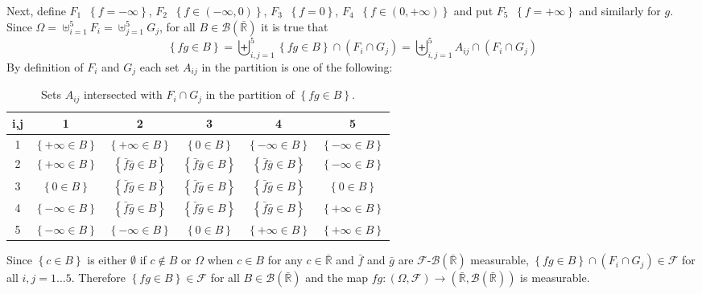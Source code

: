 \documentclass[a4paper]{article}
\newcommand{\obj}[1]{\left\{ #1 \right \}}
\newcommand{\brac}[1]{\left ( #1 \right )}
\newcommand{\Rbar}{{\bar{\mathbb{R}}}}
\newcommand{\Fcal}{\mathcal{F}}
\newcommand{\borel}[1]{\mathcal{B}\brac{#1}}
\newcommand{\defn}{\mathop{\overset{\Delta}{=}}\nolimits}
\begin{document}
Next, define $F_1\defn \obj{f=-\infty}$, $F_2\defn \obj{f\in\brac{-\infty,0}}$, $F_3\defn \obj{f=0}$, $F_4\defn \obj{f\in\brac{0,+\infty}}$ and put $F_5\defn \obj{f=+\infty}$ and similarly for $g$. Since $\Omega=\uplus_{i=1}^5 F_i = \uplus_{j=1}^5 G_j$, for all $B\in\borel{\Rbar}$ it is true that \[\obj{fg\in B} = \biguplus_{i,j=1}^5 \obj{fg\in B} \cap \brac{F_i\cap G_j} = \biguplus_{i,j=1}^5 A_{ij} \cap \brac{F_i\cap G_j}\] By definition of $F_i$ and $G_j$ each set $A_{ij}$ in the partition is one of the following:
\begin{table*}[htb]
	\centering \begin{minipage}{0.9\textwidth}
	\centering \begin{tabular}{|c|ccccc|}
		\hline
		{i,j}& \multicolumn{1}{c|}{1} & \multicolumn{1}{c|}{2} & \multicolumn{1}{c|}{3} & \multicolumn{1}{c|}{4} & \multicolumn{1}{c|}{5}\\
		\hline
		{1} & {$\obj{+\infty\in B}$} & {$\obj{+\infty\in B}$} & {$\obj{0\in B}$} & {$\obj{-\infty\in B}$} & {$\obj{-\infty\in B}$} \\ \cline{1-1}
		{2} & {$\obj{+\infty\in B}$} & {$\obj{\bar{f}\bar{g}\in B}$} & {$\obj{\bar{f}\bar{g}\in B}$} & {$\obj{\bar{f}\bar{g}\in B}$} & {$\obj{-\infty\in B}$} \\ \cline{1-1}
		{3} & {$\obj{0\in B}$} & {$\obj{\bar{f}\bar{g}\in B}$} & {$\obj{\bar{f}\bar{g}\in B}$} & {$\obj{\bar{f}\bar{g}\in B}$} & {$\obj{0\in B}$} \\ \cline{1-1}
		{4} & {$\obj{-\infty\in B}$} & {$\obj{\bar{f}\bar{g}\in B}$} & {$\obj{\bar{f}\bar{g}\in B}$} & {$\obj{\bar{f}\bar{g}\in B}$} & {$\obj{+\infty\in B}$} \\ \cline{1-1}
		{5} & {$\obj{-\infty\in B}$} & {$\obj{-\infty\in B}$} & {$\obj{0\in B}$} & {$\obj{+\infty\in B}$} & {$\obj{+\infty\in B}$} \\ \hline
	\end{tabular}
	\caption{Sets $A_{ij}$ intersected with $F_i\cap G_j$ in the partition of $\obj{fg\in B}$.}
	\end{minipage}
\end{table*}
Since $\obj{c\in B}$ is either $\emptyset$ if $c\notin B$ or $\Omega$ when $c\in B$ for any $c\in\Rbar$ and $\bar{f}$ and $\bar{g}$ are $\Fcal$-$\borel{\Rbar}$ measurable, $\obj{fg\in B} \cap \brac{F_i\cap G_j}\in \Fcal$ for all $i,j=1\ldots 5$. Therefore $\obj{fg\in B}\in \Fcal$ for all $B\in\borel{\Rbar}$ and the map $fg:\brac{\Omega, \Fcal}\to\brac{\Rbar, \borel{\Rbar}}$ is measurable.\\
\end{document}
